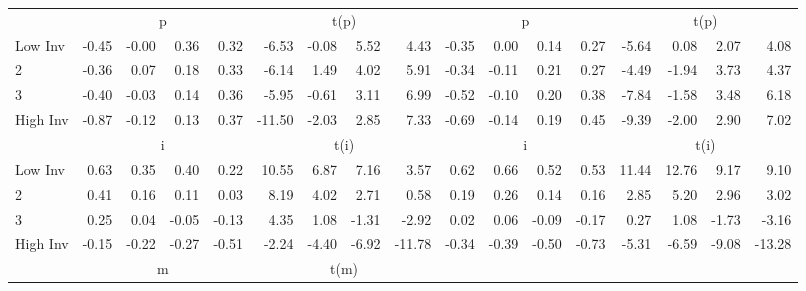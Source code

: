 \begin{table}[!ht]
\begin{tabular}{lrrrrrrrrrrrrrrrr}
  
    
      & \multicolumn{4}{c}{p} & \multicolumn{4}{c}{t(p)}
    
      & \multicolumn{4}{c}{p} & \multicolumn{4}{c}{t(p)}
    
    \\
      \cmidrule(r){2-5} \cmidrule(r){6-9} \cmidrule(r){10-13} \cmidrule(r){14-17}

    Low Inv   & -0.45  & -0.00  & 0.36  & 0.32  & -6.53  & -0.08  & 5.52  & 4.43  & -0.35  & 0.00  & 0.14  & 0.27  & -5.64  & 0.08  & 2.07  & 4.08  \\
           2  & -0.36  & 0.07  & 0.18  & 0.33  & -6.14  & 1.49  & 4.02  & 5.91  & -0.34  & -0.11  & 0.21  & 0.27  & -4.49  & -1.94  & 3.73  & 4.37  \\
           3  & -0.40  & -0.03  & 0.14  & 0.36  & -5.95  & -0.61  & 3.11  & 6.99  & -0.52  & -0.10  & 0.20  & 0.38  & -7.84  & -1.58  & 3.48  & 6.18  \\
    High Inv  & -0.87  & -0.12  & 0.13  & 0.37  & -11.50  & -2.03  & 2.85  & 7.33  & -0.69  & -0.14  & 0.19  & 0.45  & -9.39  & -2.00  & 2.90  & 7.02  \\

  
    
      & \multicolumn{4}{c}{i} & \multicolumn{4}{c}{t(i)}
    
      & \multicolumn{4}{c}{i} & \multicolumn{4}{c}{t(i)}
    
    \\
      \cmidrule(r){2-5} \cmidrule(r){6-9} \cmidrule(r){10-13} \cmidrule(r){14-17}

    Low Inv   & 0.63  & 0.35  & 0.40  & 0.22  & 10.55  & 6.87  & 7.16  & 3.57  & 0.62  & 0.66  & 0.52  & 0.53  & 11.44  & 12.76  & 9.17  & 9.10  \\
           2  & 0.41  & 0.16  & 0.11  & 0.03  & 8.19  & 4.02  & 2.71  & 0.58  & 0.19  & 0.26  & 0.14  & 0.16  & 2.85  & 5.20  & 2.96  & 3.02  \\
           3  & 0.25  & 0.04  & -0.05  & -0.13  & 4.35  & 1.08  & -1.31  & -2.92  & 0.02  & 0.06  & -0.09  & -0.17  & 0.27  & 1.08  & -1.73  & -3.16  \\
    High Inv  & -0.15  & -0.22  & -0.27  & -0.51  & -2.24  & -4.40  & -6.92  & -11.78  & -0.34  & -0.39  & -0.50  & -0.73  & -5.31  & -6.59  & -9.08  & -13.28  \\

  
    
      & \multicolumn{4}{c}{m} & \multicolumn{4}{c}{t(m)}
    

\end{tabular}
\end{table}
